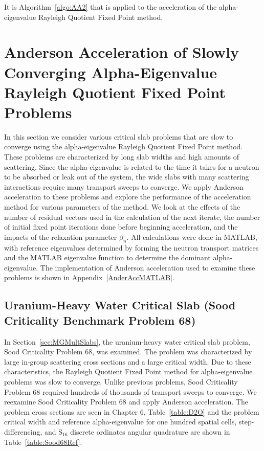 It is Algorithm~\ref{algo:AA2} that is applied to the acceleration of the alpha-eigenvalue Rayleigh Quotient Fixed Point method.

\section{Anderson Acceleration of Slowly Converging Alpha-Eigenvalue Rayleigh Quotient Fixed Point Problems}

In this section we consider various critical slab problems that are slow to converge using the alpha-eigenvalue Rayleigh Quotient Fixed Point method. These problems are characterized by long slab widths and high amounts of scattering. Since the alpha-eigenvalue is related to the time it takes for a neutron to be absorbed or leak out of the system, the wide slabs with many scattering interactions require many transport sweeps to converge. We apply Anderson acceleration to these problems and explore the performance of the acceleration method for various parameters of the method. We look at the effects of the number of residual vectors used in the calculation of the next iterate, the number of initial fixed point iterations done before beginning acceleration, and the impacts of the relaxation parameter $\beta_{n}$. All calculations were done in MATLAB, with reference eigenvalues determined by forming the neutron transport matrices and the MATLAB eigenvalue function to determine the dominant alpha-eigenvalue. The implementation of Anderson acceleration used to examine these problems is shown in Appendix~\ref{AnderAccMATLAB}.

\subsection{Uranium-Heavy Water Critical Slab (Sood Criticality Benchmark Problem 68)}

In Section~\ref{sec:MGMultSlabs}, the uranium-heavy water critical slab problem, Sood Criticality Problem 68, was examined. The problem was characterized by large in-group scattering cross sections and a large critical width. Due to these characteristics, the Rayleigh Quotient Fixed Point method for alpha-eigenvalue problems was slow to converge. Unlike previous problems, Sood Criticality Problem 68 required hundreds of thousands of transport sweeps to converge. We reexamine Sood Criticality Problem 68 and apply Anderson acceleration. The problem cross sections are seen in Chapter 6, Table~\ref{table:D2O} and the problem critical width and reference alpha-eigenvalue for one hundred spatial cells, step-differencing, and S$_{16}$ discrete ordinates angular quadrature are shown in Table~\ref{table:Sood68Ref}.

